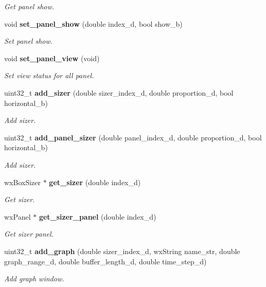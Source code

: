 \begin{DoxyCompactItemize}
\begin{DoxyCompactList}\small\item\em Get panel show. \end{DoxyCompactList}\item 
void \textbf{ set\+\_\+panel\+\_\+show} (double index\+\_\+d, bool show\+\_\+b)
\begin{DoxyCompactList}\small\item\em Set panel show. \end{DoxyCompactList}\item 
void \textbf{ set\+\_\+panel\+\_\+view} (void)
\begin{DoxyCompactList}\small\item\em Set view status for all panel. \end{DoxyCompactList}\item 
uint32\+\_\+t \textbf{ add\+\_\+sizer} (double sizer\+\_\+index\+\_\+d, double proportion\+\_\+d, bool horizontal\+\_\+b)
\begin{DoxyCompactList}\small\item\em Add sizer. \end{DoxyCompactList}\item 
uint32\+\_\+t \textbf{ add\+\_\+panel\+\_\+sizer} (double panel\+\_\+index\+\_\+d, double proportion\+\_\+d, bool horizontal\+\_\+b)
\begin{DoxyCompactList}\small\item\em Add sizer. \end{DoxyCompactList}\item 
wx\+Box\+Sizer $\ast$ \textbf{ get\+\_\+sizer} (double index\+\_\+d)
\begin{DoxyCompactList}\small\item\em Get sizer. \end{DoxyCompactList}\item 
wx\+Panel $\ast$ \textbf{ get\+\_\+sizer\+\_\+panel} (double index\+\_\+d)
\begin{DoxyCompactList}\small\item\em Get sizer panel. \end{DoxyCompactList}\item 
uint32\+\_\+t \textbf{ add\+\_\+graph} (double sizer\+\_\+index\+\_\+d, wx\+String name\+\_\+str, double graph\+\_\+range\+\_\+d, double buffer\+\_\+length\+\_\+d, double time\+\_\+step\+\_\+d)
\begin{DoxyCompactList}\small\item\em Add graph window. \end{DoxyCompactList}\item 

\end{DoxyCompactItemize}
